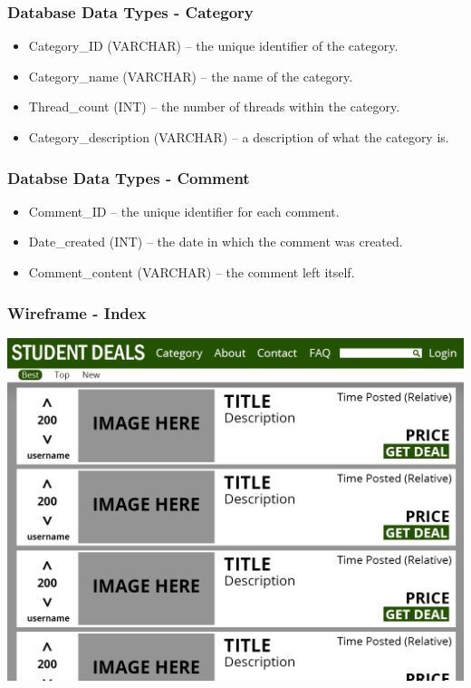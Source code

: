 \documentclass{beamer}
\begin{document}
\begin{frame}
	\frametitle{Database Data Types - Category}
	\begin{itemize}
		\item Category\_ID (VARCHAR) – the unique identifier of the category.
		\item Category\_name (VARCHAR) – the name of the category.
		\item Thread\_count (INT) – the number of threads within the category.
		\item Category\_description (VARCHAR) – a description of what the category is.
	\end{itemize}
\end{frame}

\begin{frame}
	\frametitle{Databse Data Types - Comment}
	\begin{itemize}
		\item Comment\_ID – the unique identifier for each comment.
		\item Date\_created (INT) – the date in which the comment was created.
		\item Comment\_content (VARCHAR) – the comment left itself.
	\end{itemize}
\end{frame}

\begin{frame}
	\frametitle{Wireframe - Index}
	\includegraphics[width=\textwidth,height=\textheight,keepaspectratio]{mockups/index}
\end{frame}
\end{document}
